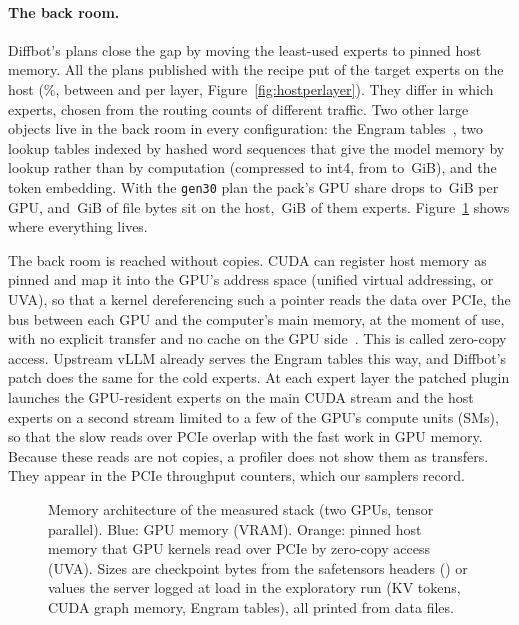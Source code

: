 

\paragraph{The back room.}
Diffbot's plans close the gap by moving the least-used experts to pinned host memory. All the plans published with the
recipe put  of the  target experts on the host
(\%, between  and
 per layer, Figure~\ref{fig:hostperlayer}). They differ in which experts, chosen
from the routing counts of different traffic. Two other large objects live in the back room in every configuration:
the Engram tables~\citep{cheng2026engram}, two lookup tables indexed by hashed word sequences that give the model
memory by lookup rather than by computation (compressed to int4, from  to
\,GiB), and the token embedding. With the \texttt{gen30} plan the pack's GPU share
drops to \,GiB per GPU, and \,GiB of file bytes sit on the
host, \,GiB of them experts. Figure~\ref{fig:memarch} shows where everything lives.

The back room is reached without copies. CUDA can register host memory as pinned and map it into the GPU's address
space (unified virtual addressing, or UVA), so that a kernel dereferencing such a pointer reads the data over PCIe, the bus between each GPU and the
computer's main memory, at the moment of use, with no explicit transfer and no cache on the GPU
side~\citep{nvidia2026cudaguide}. This is called zero-copy access. Upstream vLLM already serves the Engram tables this way, and Diffbot's patch does
the same for the cold experts. At each expert layer the patched plugin launches the GPU-resident experts on the main
CUDA stream and the host experts on a second stream limited to a few of the GPU's compute units (SMs), so that the
slow reads over PCIe overlap with the fast work in GPU memory. Because these reads are not copies, a profiler does not
show them as transfers. They appear in the PCIe throughput counters, which our samplers record.

\begin{figure}[t]
\centering
\resizebox{\linewidth}{!}{}
\caption{Memory architecture of the measured stack (two GPUs, tensor parallel). Blue: GPU memory (VRAM). Orange:
pinned host memory that GPU kernels read over PCIe by zero-copy access (UVA). Sizes are checkpoint bytes from the safetensors headers
() or values the server logged at load in the exploratory
run (KV tokens, CUDA graph memory, Engram tables), all printed from data files.}
\label{fig:memarch}
\end{figure}

